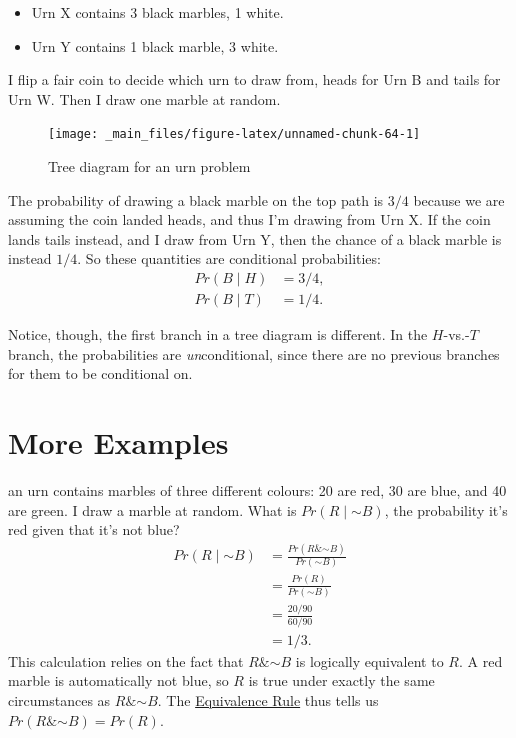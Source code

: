 \documentclass[justified]{tufte-book}
\providecommand{\tightlist}{%
  \setlength{\itemsep}{0pt}\setlength{\parskip}{0pt}}
\newcommand{\given}{\mid}
\renewcommand{\neg}{\mathbin{\sim}}
\renewcommand{\wedge}{\mathbin{\&}}
\newcommand{\p}{Pr}
\theoremstyle{definition}
\theoremstyle{definition}
\theoremstyle{definition}
\theoremstyle{remark}
\begin{document}
\begin{itemize}
\tightlist
\item
  Urn X contains 3 black marbles, 1 white.
\item
  Urn Y contains 1 black marble, 3 white.
\end{itemize}

I flip a fair coin to decide which urn to draw from, heads for Urn B and
tails for Urn W. Then I draw one marble at random.

\begin{figure}
\texttt{[image: \_main\_files/figure-latex/unnamed-chunk-64-1]} \caption[Tree diagram for an urn problem]{Tree diagram for an urn problem}\label{fig:unnamed-chunk-64}
\end{figure}

The probability of drawing a black marble on the top path is \(3/4\)
because we are assuming the coin landed heads, and thus I'm drawing from
Urn X. If the coin lands tails instead, and I draw from Urn Y, then the
chance of a black marble is instead \(1/4\). So these quantities are
conditional probabilities: \[
  \begin{aligned}
    \p(B \given H) &= 3/4,\\
    \p(B \given T) &= 1/4.
  \end{aligned}
\]

Notice, though, the first branch in a tree diagram is different. In the
\(H\)-vs.-\(T\) branch, the probabilities are \emph{un}conditional,
since there are no previous branches for them to be conditional on.

\hypertarget{more-examples}{%
\section{More Examples}\label{more-examples}}

 an urn contains marbles of three different colours:
20 are red, 30 are blue, and 40 are green. I draw a marble at random.
What is \(\p(R \given \neg B)\), the probability it's red given that
it's not blue? \[
  \begin{aligned}
    \p(R \given \neg B) &= \frac{\p(R \wedge \neg B)}{\p(\neg B)}\\
                        &= \frac{\p(R)}{\p(\neg B)}\\
                        &= \frac{20/90}{60/90}\\
                        &= 1/3.
  \end{aligned}
\] This calculation relies on the fact that \(R \wedge \neg B\) is
logically equivalent to \(R\). A red marble is automatically not blue,
so \(R\) is true under exactly the same circumstances as
\(R \wedge \neg B\). The
\protect\hyperlink{tautologies-contradictions-and-equivalent-propositions}{Equivalence
Rule} thus tells us \(\p(R \wedge \neg B) = \p(R)\).
\end{document}
